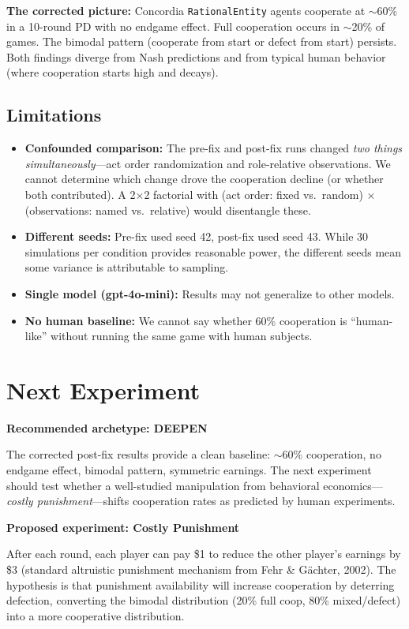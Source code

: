 \documentclass[11pt]{article}
\begin{document}
\textbf{The corrected picture:} Concordia \texttt{RationalEntity} agents cooperate at $\sim$60\% in a 10-round PD with no endgame effect. Full cooperation occurs in $\sim$20\% of games. The bimodal pattern (cooperate from start or defect from start) persists. Both findings diverge from Nash predictions and from typical human behavior (where cooperation starts high and decays).

\subsection*{Limitations}

\begin{itemize}
\item \textbf{Confounded comparison:} The pre-fix and post-fix runs changed \emph{two things simultaneously}---act order randomization and role-relative observations. We cannot determine which change drove the cooperation decline (or whether both contributed). A 2$\times$2 factorial with (act order: fixed vs.\ random) $\times$ (observations: named vs.\ relative) would disentangle these.
\item \textbf{Different seeds:} Pre-fix used seed 42, post-fix used seed 43. While 30 simulations per condition provides reasonable power, the different seeds mean some variance is attributable to sampling.
\item \textbf{Single model (gpt-4o-mini):} Results may not generalize to other models.
\item \textbf{No human baseline:} We cannot say whether 60\% cooperation is ``human-like'' without running the same game with human subjects.
\end{itemize}

\section*{Next Experiment}

\textbf{Recommended archetype: DEEPEN}

The corrected post-fix results provide a clean baseline: $\sim$60\% cooperation, no endgame effect, bimodal pattern, symmetric earnings. The next experiment should test whether a well-studied manipulation from behavioral economics---\emph{costly punishment}---shifts cooperation rates as predicted by human experiments.

\textbf{Proposed experiment: Costly Punishment}

After each round, each player can pay \$1 to reduce the other player's earnings by \$3 (standard altruistic punishment mechanism from Fehr \& G\"achter, 2002). The hypothesis is that punishment availability will increase cooperation by deterring defection, converting the bimodal distribution (20\% full coop, 80\% mixed/defect) into a more cooperative distribution.
\end{document}
